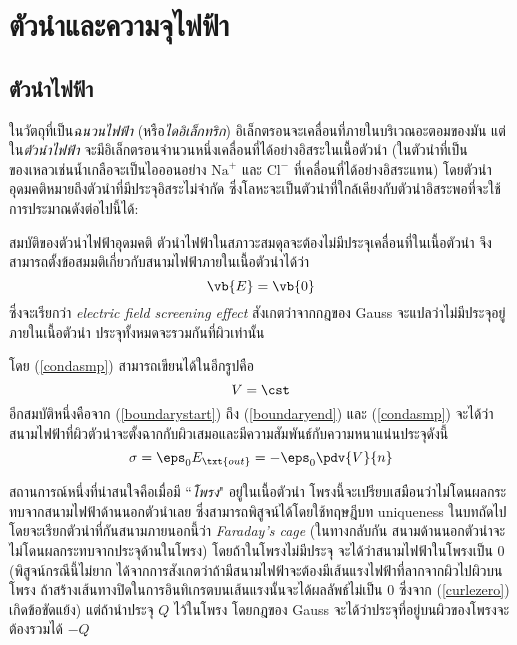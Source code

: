 \section{ตัวนำและความจุไฟฟ้า}
\subsection{ตัวนำไฟฟ้า}
ในวัตถุที่เป็น\emph{ฉนวนไฟฟ้า} (หรือ\emph{ไดอิเล็กทริก}) อิเล็กตรอนจะเคลื่อนที่ภายในบริเวณอะตอมของมัน แต่ใน\emph{ตัวนำไฟฟ้า} จะมีอิเล็กตรอนจำนวนหนึ่งเคลื่อนที่ได้อย่างอิสระในเนื้อตัวนำ (ในตัวนำที่เป็นของเหลวเช่นน้ำเกลือจะเป็นไอออนอย่าง $\mathrm{Na}^+$ และ $\mathrm{Cl}^-$ ที่เคลื่อนที่ได้อย่างอิสระแทน) โดยตัวนำอุดมคติหมายถึงตัวนำที่มีประจุอิสระไม่จำกัด ซึ่งโลหะจะเป็นตัวนำที่ใกล้เคียงกับตัวนำอิสระพอที่จะใช้การประมาณดังต่อไปนี้ได้:
\begin{lawbox}{สมบัติของตัวนำไฟฟ้าอุดมคติ}
    ตัวนำไฟฟ้าในสภาวะสมดุลจะต้องไม่มีประจุเคลื่อนที่ในเนื้อตัวนำ จึงสามารถตั้งข้อสมมติเกี่ยวกับสนามไฟฟ้าภายในเนื้อตัวนำได้ว่า
    \begin{equation}
        \vb{E} =\vb{0}\label{condasmp}
    \end{equation}
    ซึ่งจะเรียกว่า \emph{electric field screening effect} สังเกตว่าจากกฎของ Gauss จะแปลว่าไม่มีประจุอยู่ภายในเนื้อตัวนำ ประจุทั้งหมดจะรวมกันที่ผิวเท่านั้น
    
    โดย (\ref{condasmp}) สามารถเขียนได้ในอีกรูปคือ
    \begin{equation}
         V = \cst
    \end{equation}
    อีกสมบัติหนึ่งคือจาก (\ref{boundarystart}) ถึง (\ref{boundaryend}) และ (\ref{condasmp}) จะได้ว่าสนามไฟฟ้าที่ผิวตัวนำจะตั้งฉากกับผิวเสมอและมีความสัมพันธ์กับความหนาแน่นประจุดังนี้
    \begin{equation}
         \sigma=\eps_0E_\txt{out}=-\eps_0\pdv{V}{n}
    \end{equation}
\end{lawbox}
สถานการณ์หนึ่งที่น่าสนใจคือเมื่อมี ``\emph{โพรง}" อยู่ในเนื้อตัวนำ โพรงนี้จะเปรียบเสมือนว่าไม่โดนผลกระทบจากสนามไฟฟ้าด้านนอกตัวนำเลย ซึ่งสามารถพิสูจน์ได้โดยใช้ทฤษฎีบท uniqueness ในบทถัดไป โดยจะเรียกตัวนำที่กันสนามภายนอกนี้ว่า \emph{Faraday's cage} (ในทางกลับกัน สนามด้านนอกตัวนำจะไม่โดนผลกระทบจากประจุด้านในโพรง) โดยถ้าในโพรงไม่มีประจุ จะได้ว่าสนามไฟฟ้าในโพรงเป็น $0$ (พิสูจน์กรณีนี้ไม่ยาก ได้จากการสังเกตว่าถ้ามีสนามไฟฟ้าจะต้องมีเส้นแรงไฟฟ้าที่ลากจากผิวไปผิวบนโพรง ถ้าสร้างเส้นทางปิดในการอินทิเกรตบนเส้นแรงนั้นจะได้ผลลัพธ์ไม่เป็น $0$ ซึ่งจาก (\ref{curlezero}) เกิดข้อขัดแย้ง) แต่ถ้านำประจุ $Q$ ไว้ในโพรง โดยกฎของ Gauss จะได้ว่าประจุที่อยู่บนผิวของโพรงจะต้องรวมได้ $-Q$

